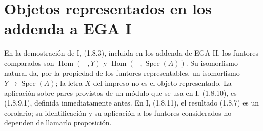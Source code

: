 \documentclass[11pt,a4paper]{article}
\DeclareMathOperator{\Spec}{Spec}
\begin{document}
\section{Objetos representados en los addenda a EGA I}
En la demostración de I, (1.8.3), incluida en los addenda de EGA II,
los funtores comparados son $\operatorname{Hom}(-,Y)$ y
$\operatorname{Hom}(-,\Spec(A))$. Su isomorfismo natural da,
por la propiedad de los funtores representables, un isomorfismo
$Y\to\Spec(A)$; la letra $X$ del impreso no es el objeto representado.
La aplicación sobre pares provistos de un módulo que se usa en
I, (1.8.10), es (1.8.9.1), definida inmediatamente antes.
En I, (1.8.11), el resultado (1.8.7) es un corolario; su
identificación y su aplicación a los funtores considerados no
dependen de llamarlo proposición.
\end{document}

